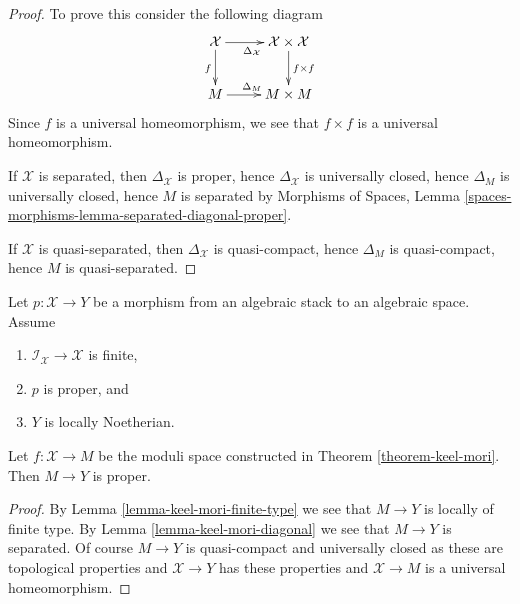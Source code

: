 \begin{proof}
To prove this consider the following diagram
$$
\xymatrix{
\mathcal{X} \ar[d]_f \ar[r]_{\Delta_\mathcal{X}} &
\mathcal{X} \times \mathcal{X} \ar[d]^{f \times f} \\
M \ar[r]^{\Delta_M} &
M \times M
}
$$
Since $f$ is a universal homeomorphism, we see that
$f \times f$ is a universal homeomorphism.

\medskip\noindent
If $\mathcal{X}$ is separated, then $\Delta_\mathcal{X}$ is proper,
hence $\Delta_\mathcal{X}$ is universally closed, hence
$\Delta_M$ is universally closed, hence $M$ is separated
by Morphisms of Spaces, Lemma
\ref{spaces-morphisms-lemma-separated-diagonal-proper}.

\medskip\noindent
If $\mathcal{X}$ is quasi-separated, then $\Delta_\mathcal{X}$ is
quasi-compact, hence $\Delta_M$ is quasi-compact, hence $M$ is
quasi-separated.
\end{proof}

\begin{lemma}
\label{lemma-keel-mori-proper}
Let $p : \mathcal{X} \to Y$ be a morphism from an algebraic stack
to an algebraic space. Assume
\begin{enumerate}
\item $\mathcal{I}_\mathcal{X} \to \mathcal{X}$ is finite,
\item $p$ is proper, and
\item $Y$ is locally Noetherian.
\end{enumerate}
Let $f : \mathcal{X} \to M$ be the moduli space constructed in
Theorem \ref{theorem-keel-mori}. Then $M \to Y$ is proper.
\end{lemma}

\begin{proof}
By Lemma \ref{lemma-keel-mori-finite-type}
we see that $M \to Y$ is locally of finite type.
By Lemma \ref{lemma-keel-mori-diagonal} we see that
$M \to Y$ is separated.
Of course $M \to Y$ is quasi-compact and universally closed
as these are topological properties and $\mathcal{X} \to Y$
has these properties and $\mathcal{X} \to M$ is a universal
homeomorphism.
\end{proof}

